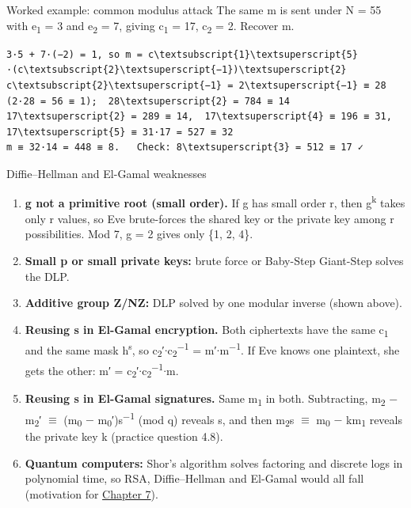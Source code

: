\documentclass[11pt,a4paper]{article}
\begin{document}
\begin{example}{Worked example: common modulus attack}
The same m is sent under N = 55 with e\textsubscript{1} = 3 and e\textsubscript{2} = 7, giving c\textsubscript{1} = 17, c\textsubscript{2} = 2. Recover m.\par
\begin{workbox}
\begin{Verbatim}[commandchars=\\\{\},fontsize=\footnotesize]
3·5 + 7·(−2) = 1, so m = c\textsubscript{1}\textsuperscript{5}·(c\textsubscript{2}\textsuperscript{−1})\textsuperscript{2}
c\textsubscript{2}\textsuperscript{−1} = 2\textsuperscript{−1} ≡ 28 (2·28 = 56 ≡ 1);  28\textsuperscript{2} = 784 ≡ 14
17\textsuperscript{2} = 289 ≡ 14,  17\textsuperscript{4} ≡ 196 ≡ 31,  17\textsuperscript{5} ≡ 31·17 = 527 ≡ 32
m ≡ 32·14 = 448 ≡ 8.   Check: 8\textsuperscript{3} = 512 ≡ 17 ✓
\end{Verbatim}
\end{workbox}
\end{example}
\begin{concept}{Diffie–Hellman and El-Gamal weaknesses}
\begin{enumerate}
\item \textbf{g not a primitive root (small order).} If g has small order r, then g\textsuperscript{k} takes only r values, so Eve brute-forces the shared key or the private key among r possibilities. Mod 7, g = 2 gives only \{1, 2, 4\}.
\item \textbf{Small p or small private keys:} brute force or Baby-Step Giant-Step solves the DLP.
\item \textbf{Additive group Z/NZ:} DLP solved by one modular inverse (shown above).
\item \textbf{Reusing s in El-Gamal encryption.} Both ciphertexts have the same c\textsubscript{1} and the same mask h\textsuperscript{s}, so c\textsubscript{2}′\ensuremath{\cdot}c\textsubscript{2}\textsuperscript{\ensuremath{-}1} = m′\ensuremath{\cdot}m\textsuperscript{\ensuremath{-}1}. If Eve knows one plaintext, she gets the other: m′ = c\textsubscript{2}′\ensuremath{\cdot}c\textsubscript{2}\textsuperscript{\ensuremath{-}1}\ensuremath{\cdot}m.
\item \textbf{Reusing s in El-Gamal signatures.} Same m\textsubscript{1} in both. Subtracting, m\textsubscript{2} \ensuremath{-} m\textsubscript{2}′ \ensuremath{\equiv} (m\textsubscript{0} \ensuremath{-} m\textsubscript{0}′)s\textsuperscript{\ensuremath{-}1} (mod q) reveals s, and then m\textsubscript{2}s \ensuremath{\equiv} m\textsubscript{0} \ensuremath{-} km\textsubscript{1} reveals the private key k (practice question 4.8).
\item \textbf{Quantum computers:} Shor's algorithm solves factoring and discrete logs in polynomial time, so RSA, Diffie–Hellman and El-Gamal would all fall (motivation for \hyperref[ch7]{Chapter 7}).
\end{enumerate}
\end{concept}
\end{document}
